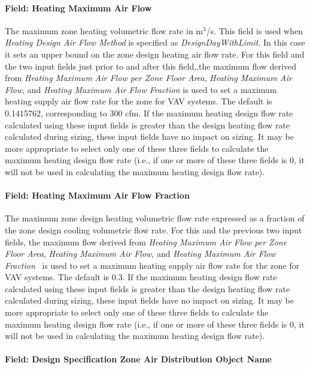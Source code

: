 \paragraph{Field: Heating Maximum Air Flow}\label{field-heating-maximum-air-flow}

The maximum zone heating volumetric flow rate in m\(^{3}\)/s. This field is used when \emph{Heating Design Air Flow Method} is specified as \emph{DesignDayWithLimit}. In this case it sets an upper bound on the zone design heating air flow rate. For this field and the two input fields just prior to and after this field,,the maximum flow derived from \emph{Heating Maximum Air Flow per Zone Floor Area}, \emph{Heating Maximum Air Flow}, and \emph{Heating Maximum Air Flow Fraction} is used to set a maximum heating supply air flow rate for the zone for VAV systems. The default is 0.1415762, corresponding to 300 cfm. If the maximum heating design flow rate calculated using these input fields is greater than the design heating flow rate calculated during sizing, these input fields have no impact on sizing. It may be more appropriate to select only one of these three fields to calculate the maximum heating design flow rate (i.e., if one or more of these three fields is 0, it will not be used in calculating the maximum heating design flow rate).

\paragraph{Field: Heating Maximum Air Flow Fraction}\label{field-heating-maximum-air-flow-fraction}

The maximum zone design heating volumetric flow rate expressed as a fraction of the zone design cooling volumetric flow rate. For this and the previous two input fields, the maximum flow derived from \emph{Heating Maximum Air Flow per Zone Floor Area}, \emph{Heating Maximum Air Flow}, and \emph{Heating Maximum Air Flow Fraction}~ is used to set a maximum heating supply air flow rate for the zone for VAV systems. The default is 0.3. If the maximum heating design flow rate calculated using these input fields is greater than the design heating flow rate calculated during sizing, these input fields have no impact on sizing. It may be more appropriate to select only one of these three fields to calculate the maximum heating design flow rate (i.e., if one or more of these three fields is 0, it will not be used in calculating the maximum heating design flow rate).

\paragraph{Field: Design Specification Zone Air Distribution Object Name}\label{field-design-specification-zone-air-distribution-object-name}

